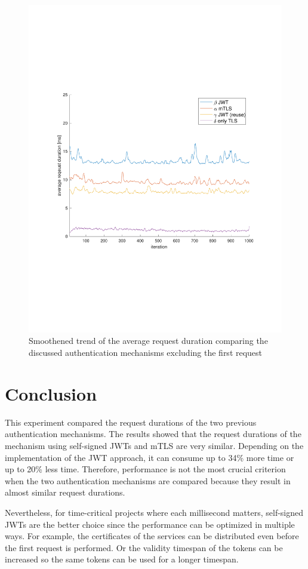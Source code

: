 \begin{figure}
	\centering
	\includegraphics[trim=0 200 0 200, clip, width=\textwidth]{images/experiment/experiment-trend.pdf}
	\caption{Smoothened trend of the average request duration comparing the discussed authentication mechanisms excluding the first request}
	\label{fig:trend}
\end{figure}

\section{Conclusion}
This experiment compared the request durations of the two previous authentication mechanisms.
The results showed that the request durations of the mechanism using self-signed JWTs and mTLS are very similar.
Depending on the implementation of the JWT approach, it can consume up to 34\% more time or up to 20\% less time.
Therefore, performance is not the most crucial criterion when the two authentication mechanisms are compared because they result in almost similar request durations.

Nevertheless, for time-critical projects where each millisecond matters, self-signed JWTs are the better choice since the performance can be optimized in multiple ways.
For example, the certificates of the services can be distributed even before the first request is performed.
Or the validity timespan of the tokens can be increased so the same tokens can be used for a longer timespan.
